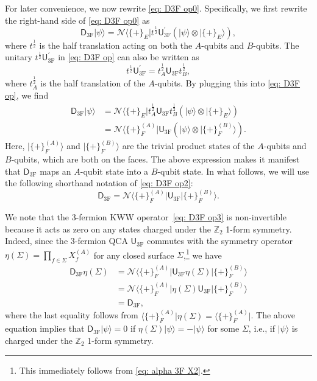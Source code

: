 \documentclass[aps,twocolumn,prx,floatfix,preprintnumbers, nofootinbib,10pt]{revtex4-2}
\numberwithin{equation}{section}
\theoremstyle{definition}
\theoremstyle{remark}
\theoremstyle{claim}
\def\bra#1{{\langle{#1}|}}
\def\ket#1{{|{#1}\rangle}}
\renewcommand{\sf}[1]{\mathsf{#1}}
\begin{document}
For later convenience, we now rewrite \eqref{eq: D3F op0}.
Specifically, we first rewrite the right-hand side of \eqref{eq: D3F op0} as
\begin{equation}
\mathsf{D}_\text{3F}\ket{\psi} = \mathcal{N} \bra{\{+\}_E} t^{\frac{1}{2}} \sf{U}_\text{3F}^{\prime} \left( \ket{\psi} \otimes \ket{\{+\}_E} \right),
\label{eq: D3F op}
\end{equation}
where $t^{\frac{1}{2}}$ is the half translation acting on both the $A$-qubits and $B$-qubits.
The unitary $t^{\frac{1}{2}} \sf{U}_\text{3F}^{\prime}$ in \eqref{eq: D3F op} can also be written as
\begin{equation}
t^{\frac{1}{2}} \sf{U}_\text{3F}^{\prime} = t_A^{\frac{1}{2}} \sf{U}_\text{3F} t_B^{\frac{1}{2}},
\end{equation}
where $t_A^{\frac{1}{2}}$ is the half translation of the $A$-qubits.
By plugging this into \eqref{eq: D3F op}, we find
\begin{equation}
\begin{aligned}
\mathsf{D}_\text{3F} \ket{\psi} &= \mathcal{N} \bra{\{+\}_E} t_A^{\frac{1}{2}} \sf{U}_\text{3F} t_B^{\frac{1}{2}} \left( \ket{\psi} \otimes \ket{\{+\}_E} \right) \\
&= \mathcal{N} \bra{\{+\}_F^{(A)}} \sf{U}_\text{3F} \left( \ket{\psi} \otimes \ket{\{+\}_F^{(B)}} \right).
\end{aligned}
\label{eq: D3F op2}
\end{equation}
Here, $\ket{\{+\}_F^{(A)}}$ and $\ket{\{+\}_F^{(B)}}$ are the trivial product states of the $A$-qubits and $B$-qubits, which are both on the faces.
The above expression makes it manifest that $\mathsf{D}_\text{3F}$ maps an $A$-qubit state into a $B$-qubit state.
In what follows, we will use the following shorthand notation of \eqref{eq: D3F op2}:
\begin{equation}
\mathsf{D}_\text{3F} = \mathcal{N} \bra{\{+\}_F^{(A)}} \sf{U}_\text{3F} \ket{\{+\}_F^{(B)}}.
\label{eq: D3F op3}
\end{equation}

We note that the 3-fermion KWW operator~\eqref{eq: D3F op3} is non-invertible because it acts as zero on any states charged under the $\mathbb{Z}_2$ 1-form symmetry.
Indeed, since the 3-fermion QCA $\sf{U}_\text{3F}$ commutes with the symmetry operator $\eta(\Sigma) = \prod_{f \in \Sigma} X_f^{(A)}$ for any closed surface $\Sigma$,\footnote{This immediately follows from \eqref{eq: alpha 3F X2}.} we have
\begin{equation}
\begin{aligned}
\mathsf{D}_\text{3F} \eta(\Sigma) &= \mathcal{N} \bra{\{+\}_F^{(A)}} \sf{U}_\text{3F} \eta(\Sigma) \ket{\{+\}_F^{(B)}} \\
&= \mathcal{N} \bra{\{+\}_F^{(A)}} \eta(\Sigma) \sf{U}_\text{3F} \ket{\{+\}_F^{(B)}} \\
&= \mathsf{D}_\text{3F},
\end{aligned}
\end{equation}
where the last equality follows from $\bra{\{+\}_F^{(A)}} \eta(\Sigma) = \bra{\{+\}_F^{(A)}}$.
The above equation implies that $\mathsf{D}_\text{3F} \ket{\psi} = 0$ if $\eta(\Sigma) \ket{\psi} = -\ket{\psi}$ for some $\Sigma$, i.e., if $\ket{\psi}$ is charged under the $\mathbb{Z}_2$ 1-form symmetry.
\end{document}
